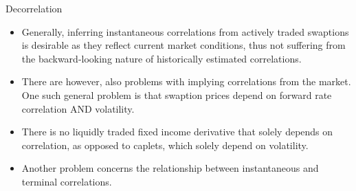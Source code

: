 \documentclass{beamer}
\begin{document}

\begin{frame}{Decorrelation}
\begin{itemize}
	\item<1-> Generally, inferring instantaneous correlations from actively traded swaptions is desirable as they reflect current market conditions, thus not suffering from the backward-looking nature of historically estimated correlations. 
	\item<2-> There are however, also problems with implying correlations from the market. One such general problem is that swaption prices depend on forward rate correlation AND volatility. 
	\item<3-> There is no liquidly traded fixed income derivative that solely depends on correlation, as opposed to caplets, which solely depend on volatility.
	\item<4-> Another problem concerns the relationship between instantaneous and terminal correlations.
\end{itemize}
\end{frame}	
	 
\end{document}

